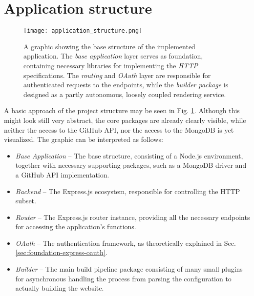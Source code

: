 \section{Application structure}
\label{sec:applicationstructure}

\begin{figure} %
    \centering
    \texttt{[image: application\_structure.png]}
    \caption{A graphic showing the base structure of the implemented application. The \emph{base application} layer serves as foundation, containing necessary libraries for implementing the \emph{HTTP} specifications. The \emph{routing} and \emph{OAuth} layer are responsible for authenticated requests to the endpoints, while the \emph{builder package} is designed as a partly autonomous, loosely coupled rendering service.}
    \label{fig:application_structure}
\end{figure}
%

A basic approach of the project structure may be seen in Fig. \ref{fig:application_structure}. Although this might look still very abstract, the core packages are already clearly visible, while neither the access to the GitHub API, nor the access to the MongoDB is yet visualized.
The graphic can be interpreted as follows:

\begin{itemize}
  \item \emph{Base Application} -- The base structure, consisting of a Node.js environment, together with necessary supporting packages, such as a MongoDB driver and a GitHub API implementation.
  \item \emph{Backend} -- The Express.js ecosystem, responsible for controlling the HTTP subset.
  \item \emph{Router} -- The Express.js router instance, providing all the necessary endpoints for accessing the application's functions.
  \item \emph{OAuth} -- The authentication framework, as theoretically explained in Sec. \ref{sec:foundation-express-oauth}.
  \item \emph{Builder} -- The main build pipeline package consisting of many small plugins for asynchronous handling the process from parsing the configuration to actually building the website.
\end{itemize}




